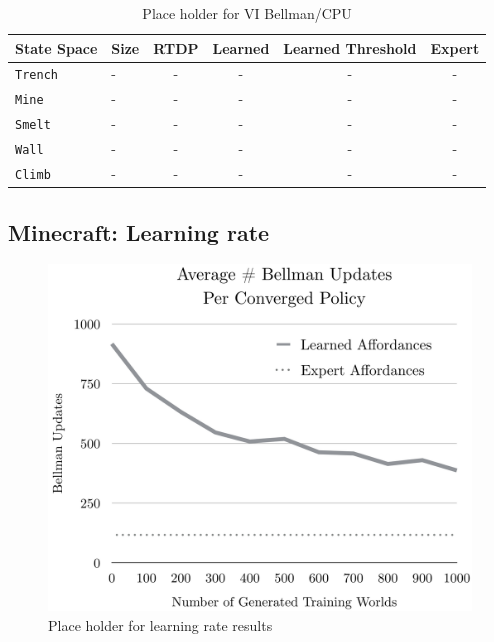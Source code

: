 \documentclass[conference]{IEEEtran}
\begin{document}
\begin{table}[H]
\centering
\begin{tabular}{ l l || c c c c }
  State Space 		&	Size 	&	RTDP 	& Learned & Learned Threshold & Expert 	\\ \hline
  \texttt{Trench}  	& 	-	&	-		&	-	&	-			&	-	\\
  \texttt{Mine}  		& 	-	&	-		&	-	&	-  			&	-	\\
  \texttt{Smelt}  		& 	-	&	-		&	-	&	-  			&	-	\\
  \texttt{Wall}  		& 	-	&	-		&	-	&	-			&	-	\\
  \texttt{Climb}  		& 	-	&	-		&	-	&	- 			&	-	\\
\end{tabular}
\caption{Place holder for VI Bellman/CPU}
\label{table:minecraft_results_bellman}
\end{table}

\subsection{Minecraft: Learning rate}

\begin{figure}[H]
\centering
\includegraphics[scale=0.195]{figures/training_results.png}%
  \caption{Place holder for learning rate results}
  \label{fig:training_results}
\end{figure}
\end{document}
